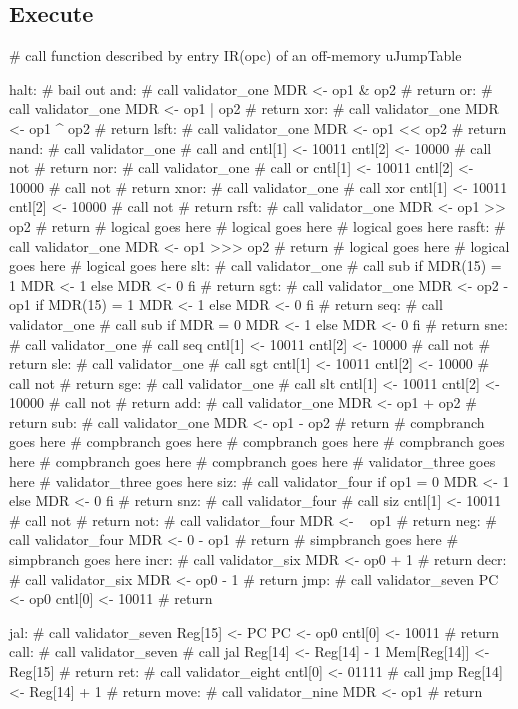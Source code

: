 \documentclass[12pt]{article}
\begin{document}
\subsection{Execute}
\begin{verbatimtab}
# call function described by entry IR(opc) of an off-memory uJumpTable

halt:
	# bail out
and:
	# call validator_one
	MDR <- op1 & op2
	# return
or:
	# call validator_one
	MDR <- op1 | op2
	# return
xor:
	# call validator_one
	MDR <- op1 ^ op2
	# return
lsft:
	# call validator_one
	MDR <- op1 << op2
	# return
nand:
	# call validator_one
	# call and
	cntl[1] <- 10011
	cntl[2] <- 10000
	# call not
	# return
nor:
	# call validator_one
	# call or
	cntl[1] <- 10011
	cntl[2] <- 10000
	# call not
	# return
xnor:
	# call validator_one
	# call xor
	cntl[1] <- 10011
	cntl[2] <- 10000
	# call not
	# return
rsft:
	# call validator_one
	MDR <- op1 >> op2
	# return
# logical goes here
# logical goes here
# logical goes here
rasft:
	# call validator_one
	MDR <- op1 >>> op2
	# return
# logical goes here
# logical goes here
# logical goes here
slt:
	# call validator_one
	# call sub
	if MDR(15) = 1
		MDR <- 1
	else
		MDR <- 0
	fi
	# return
sgt:
	# call validator_one
	MDR <- op2 - op1
	if MDR(15) = 1
		MDR <- 1
	else
		MDR <- 0
	fi
	# return
seq:
	# call validator_one
	# call sub
	if MDR = 0
		MDR <- 1
	else
		MDR <- 0
	fi
	# return
sne:
	# call validator_one
	# call seq
	cntl[1] <- 10011
	cntl[2] <- 10000
	# call not
	# return
sle:
	# call validator_one
	# call sgt
	cntl[1] <- 10011
	cntl[2] <- 10000
	# call not
	# return
sge:
	# call validator_one
	# call slt
	cntl[1] <- 10011
	cntl[2] <- 10000
	# call not
	# return
add:
	# call validator_one
	MDR <- op1 + op2
	# return
sub:
	# call validator_one
	MDR <- op1 - op2
	# return
# compbranch goes here
# compbranch goes here
# compbranch goes here
# compbranch goes here
# compbranch goes here
# compbranch goes here
# validator_three goes here
# validator_three goes here
siz:
	# call validator_four
	if op1 = 0
	   MDR <- 1
	else
	   MDR <- 0
	fi
	# return
snz:
	# call validator_four
	# call siz
	cntl[1] <- 10011
	# call not
	# return
not:
	# call validator_four
	MDR <- ~ op1
	# return
neg:
	# call validator_four
	MDR <- 0 - op1
	# return
# simpbranch goes here
# simpbranch goes here
incr:
	# call validator_six
	MDR <- op0 + 1
	# return
decr:
	# call validator_six
	MDR <- op0 - 1
	# return
jmp:
	# call validator_seven
	PC <- op0
	cntl[0] <- 10011
	# return

jal:
	# call validator_seven
	Reg[15] <- PC
	PC <- op0
	cntl[0] <- 10011
	# return
call:
	# call validator_seven
	# call jal
	Reg[14] <- Reg[14] - 1
	Mem[Reg[14]] <- Reg[15]
	# return
ret:
	# call validator_eight
	cntl[0] <- 01111
	# call jmp
	Reg[14] <- Reg[14] + 1
	# return
move:
	# call validator_nine
	MDR <- op1
	# return


\end{verbatimtab}
\end{document}
